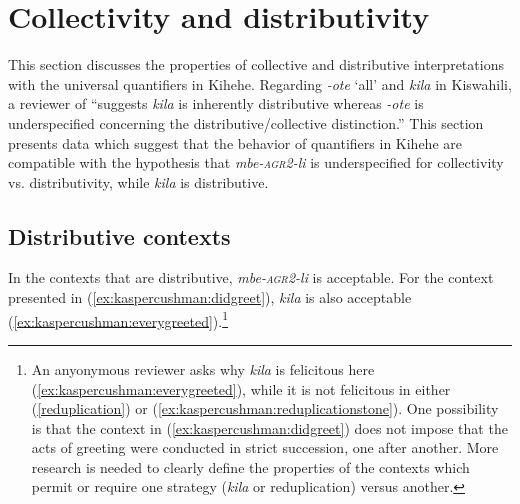 \documentclass[letterpaper, 12pt]{article}
\begin{document}
\section{Collectivity and distributivity}

This section discusses the properties of collective and distributive interpretations with the universal quantifiers in Kihehe. 
Regarding \textit{-ote} `all' and \textit{kila} in Kiswahili, a reviewer of \citealt[p. 396]{zerbian08} ``suggests \textit{kila} is inherently distributive whereas \textit{-ote} is underspecified concerning the distributive/collective distinction.''  This section presents data which suggest that the behavior of quantifiers in Kihehe are compatible with the hypothesis that \textit{mbe-\textsc{agr2}-li} is underspecified for collectivity vs. distributivity, while \textit{kila} is distributive.

\subsection{Distributive contexts}

In the contexts that are distributive, \textit{mbe-\textsc{agr2}-li} is acceptable. For the context presented in (\ref{ex:kaspercushman:didgreet}), \textit{kila} is also acceptable (\ref{ex:kaspercushman:everygreeted}).\footnote{An anyonymous reviewer asks why \textit{kila} is felicitous here (\ref{ex:kaspercushman:everygreeted}), while it is not felicitous in either (\ref{reduplication}) or (\ref{ex:kaspercushman:reduplicationstone}). One possibility is that the context in (\ref{ex:kaspercushman:didgreet}) does not impose that the acts of greeting were conducted in strict succession, one after another.  More research is needed to clearly define the properties of the contexts which permit or require one strategy (\textit{kila} or reduplication) versus another.} 
\end{document}

